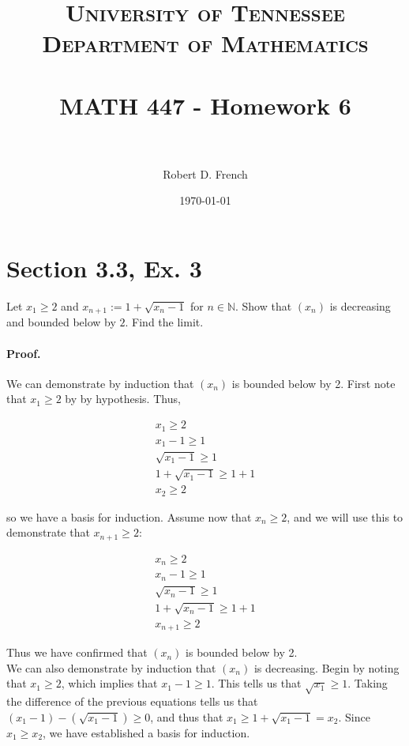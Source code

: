 \documentclass[paper=a4, fontsize=11pt]{scrartcl} %
\title{	
\normalfont \normalsize 
\textsc{University of Tennessee \\ Department of Mathematics} \\ [25pt] %
\horrule{0.5pt} \\[0.4cm] %
\huge MATH 447 - Homework 6 \\ %
\horrule{2pt} \\[0.5cm] %
}
\author{Robert D. French} %
\date{\normalsize\today} %
\numberwithin{equation}{section} %
\numberwithin{figure}{section} %
\numberwithin{table}{section} %
\begin{document}
\maketitle %


\section*{Section 3.3, Ex. 3}
\newcommand{\nin}{n \in \mathbb{N}}
\newcommand{\pf}{\paragraph{Proof.}}
\newcommand{\done}{$\blacksquare$}

Let $x_1 \geq 2$ and $x_{n+1} := 1 + \sqrt{x_n - 1}$ for $\nin$. Show that $(x_n)$ is decreasing and bounded below by $2$. Find the limit.

\pf We can demonstrate by induction that $(x_n)$ is bounded below by 2. First note that $x_1 \geq 2$ by by hypothesis. Thus,

\begin{gather*}
x_1 \geq 2 \\
x_1 - 1 \geq 1\\
\sqrt{x_1 - 1} \geq 1\\
1 + \sqrt{x_1 - 1} \geq 1 + 1\\
x_2 \geq 2
\end{gather*}

so we have a basis for induction. Assume now that $x_n \geq 2$, and we will use this to demonstrate that $x_{n+1} \geq 2$:

\begin{gather*}
x_n \geq 2 \\
x_n - 1 \geq 1\\
\sqrt{x_n - 1} \geq 1\\
1 + \sqrt{x_n - 1} \geq 1 + 1\\
x_{n+1} \geq 2
\end{gather*}

Thus we have confirmed that $(x_n)$ is bounded below by 2.\\

We can also demonstrate by induction that $(x_n)$ is decreasing. Begin by noting that $x_1 \geq 2$, which implies that $x_1 - 1 \geq 1$. This tells us that $\sqrt{x_1} \geq 1$. Taking the difference of the previous equations tells us that $(x_1 - 1) - (\sqrt{x_1 - 1}) \geq 0$, and thus that $x_1 \geq 1 + \sqrt{x_1 - 1} = x_2$. Since $x_1 \geq x_2$, we have established a basis for induction.\\
\end{document}
